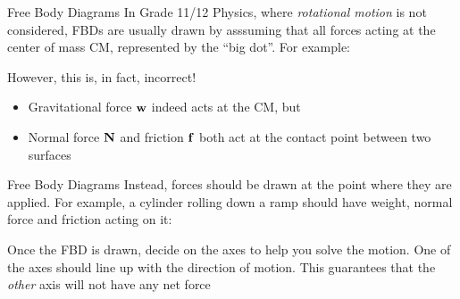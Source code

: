 \documentclass[12pt,compress,aspectratio=169]{beamer}
\newcommand{\mb}[1]{\ensuremath\mathbf{#1}}
\begin{document}
\begin{frame}{Free Body Diagrams}
  In Grade 11/12 Physics, where \emph{rotational motion} is not considered, FBDs
  are usually drawn by asssuming that all forces acting at the center of mass CM,
  represented by the ``big dot''. For example:
  \begin{center}
  \end{center}
  However, this is, in fact, incorrect!
  \begin{itemize}
  \item Gravitational force $\mb{w}$ indeed acts at the CM, but
  \item Normal force $\mb{N}$ and friction $\mb{f}$ both act at the contact
    point between two surfaces
  \end{itemize}
\end{frame}



\begin{frame}{Free Body Diagrams}
  Instead, forces should be drawn at the point where they are applied. For
  example, a cylinder rolling down a ramp should have weight, normal force and
  friction acting on it:
  \begin{center}
  \end{center}
  Once the FBD is drawn, decide on the axes to help you solve the motion. One of
  the axes should line up with the direction of motion. This guarantees that the 
  \emph{other} axis will not have any net force
\end{frame}
\end{document}
